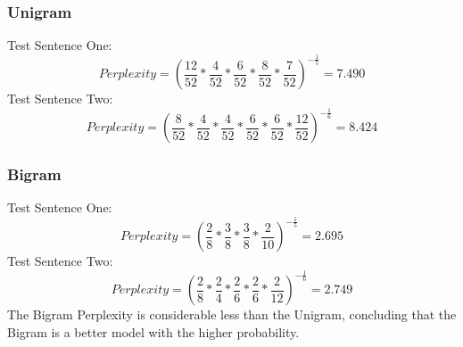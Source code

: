 \documentclass{article}
\begin{document}
\subsubsection{Unigram}
Test Sentence One: 
\begin{equation}
	Perplexity =(\frac{12}{52}*\frac{4}{52}*\frac{6}{52}*\frac{8}{52}*\frac{7}{52})^{-\frac{1}{5}} = 7.490 \label{Test Case One}
\end{equation}
Test Sentence Two: 
\begin{equation}
	Perplexity =(\frac{8}{52}*\frac{4}{52}*\frac{4}{52}*\frac{6}{52}*\frac{6}{52}*\frac{12}{52})^{-\frac{1}{6}} = 8.424 \label{Test Case One}
\end{equation}
\subsubsection{Bigram}
Test Sentence One: 
\begin{equation}
	Perplexity =(\frac{2}{8} * \frac{3}{8} * \frac{3}{8} * \frac{2}{10})^{-\frac{1}{5}} = 2.695
\end{equation}
Test Sentence Two: 
\begin{equation}
	Perplexity =(\frac{2}{8} * \frac{2}{4} * \frac{2}{6} * \frac{2}{6} * \frac{2}{12})^{-\frac{1}{6}} = 2.749
\end{equation}
The Bigram Perplexity is considerable less than the Unigram, concluding that the Bigram is a better model with the higher probability.
\end{document}
